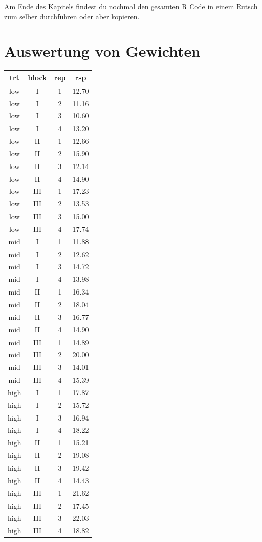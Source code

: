 \documentclass[
  letterpaper,
  DIV=11,
  oneside]{scrreport}
\begin{document}
Am Ende des Kapitels findest du nochmal den gesamten R Code in einem
Rutsch zum selber durchführen oder aber kopieren.

\hypertarget{auswertung-von-gewichten}{%
\section{Auswertung von Gewichten}\label{auswertung-von-gewichten}}

\begin{longtable}[]{@{}cccc@{}}
\toprule()
trt & block & rep & rsp \\
\midrule()
\endhead
low & I & 1 & 12.70 \\
low & I & 2 & 11.16 \\
low & I & 3 & 10.60 \\
low & I & 4 & 13.20 \\
low & II & 1 & 12.66 \\
low & II & 2 & 15.90 \\
low & II & 3 & 12.14 \\
low & II & 4 & 14.90 \\
low & III & 1 & 17.23 \\
low & III & 2 & 13.53 \\
low & III & 3 & 15.00 \\
low & III & 4 & 17.74 \\
mid & I & 1 & 11.88 \\
mid & I & 2 & 12.62 \\
mid & I & 3 & 14.72 \\
mid & I & 4 & 13.98 \\
mid & II & 1 & 16.34 \\
mid & II & 2 & 18.04 \\
mid & II & 3 & 16.77 \\
mid & II & 4 & 14.90 \\
mid & III & 1 & 14.89 \\
mid & III & 2 & 20.00 \\
mid & III & 3 & 14.01 \\
mid & III & 4 & 15.39 \\
high & I & 1 & 17.87 \\
high & I & 2 & 15.72 \\
high & I & 3 & 16.94 \\
high & I & 4 & 18.22 \\
high & II & 1 & 15.21 \\
high & II & 2 & 19.08 \\
high & II & 3 & 19.42 \\
high & II & 4 & 14.43 \\
high & III & 1 & 21.62 \\
high & III & 2 & 17.45 \\
high & III & 3 & 22.03 \\
high & III & 4 & 18.82 \\
\bottomrule()
\end{longtable}
\end{document}
